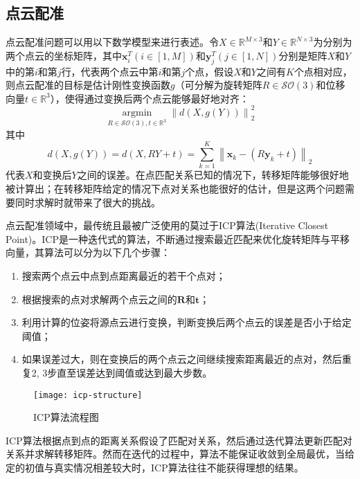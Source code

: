 \subsection{点云配准}
点云配准问题可以用以下数学模型来进行表述。令$X\in\mathbb{R}^{M\times 3}$和$Y\in\mathbb{R}^{N\times 3}$为分别为两个点云的坐标矩阵，其中$\boldsymbol{x}_i^T(i\in[1,M])$和$\boldsymbol{y}_j^T(j\in[1,N])$分别是矩阵$X$和$Y$中的第$i$和第$j$行，代表两个点云中第$i$和第$j$个点，假设$X$和$Y$之间有$K$个点相对应，则点云配准的目标是估计刚性变换函数$g$（可分解为旋转矩阵$R\in\mathcal{SO}(3)$和位移向量$t\in\mathbb{R}^3$），使得通过变换后两个点云能够最好地对齐：
\begin{equation}
	\label{eq: registration-function}
	\mathop{\arg\min}\limits_{R\in\mathcal{SO}(3), t\in\mathbb{R}^3} \left\| d(X,g(Y)) \right\|_2^2
\end{equation}
其中
\begin{equation}
	d(X,g(Y))=d(X,RY+t)=\sum_{k=1}^K\left\| \boldsymbol{x}_k-(R\boldsymbol{y}_k+t) \right\|_2
\end{equation}
代表$X$和变换后$Y$之间的误差。在点匹配关系已知的情况下，转移矩阵能够很好地被计算出；在转移矩阵给定的情况下点对关系也能很好的估计，但是这两个问题需要同时求解时就带来了很大的挑战\cite{huang2021comprehensive}。

点云配准领域中，最传统且最被广泛使用的莫过于ICP算法\cite{besl1992method}(Iterative Closest Point)。ICP是一种迭代式的算法，不断通过搜索最近匹配来优化旋转矩阵与平移向量，其算法可以分为以下几个步骤：
\begin{enumerate}
	\item 搜索两个点云中点到点距离最近的若干个点对；
	\item 根据搜索的点对求解两个点云之间的$\boldsymbol{R}$和$\boldsymbol{t}$；
	\item 利用计算的位姿将源点云进行变换，判断变换后两个点云的误差是否小于给定阈值；
	\item 如果误差过大，则在变换后的两个点云之间继续搜索距离最近的点对，然后重复2, 3步直至误差达到阈值或达到最大步数。
\end{enumerate}

\begin{figure}
	\centering
	\texttt{[image: icp-structure]}
	\caption{ICP算法流程图}
	\label{icp-structure}
\end{figure}

ICP算法根据点到点的距离关系假设了匹配对关系，然后通过迭代算法更新匹配对关系并求解转移矩阵。然而在迭代的过程中，算法不能保证收敛到全局最优，当给定的初值与真实情况相差较大时，ICP算法往往不能获得理想的结果。

